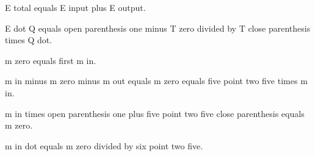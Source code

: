 E total equals E input plus E output.

E dot Q equals open parenthesis one minus T zero divided by T close parenthesis times Q dot.

m zero equals first m in.

m in minus m zero minus m out equals m zero equals five point two five times m in.

m in times open parenthesis one plus five point two five close parenthesis equals m zero.

m in dot equals m zero divided by six point two five.